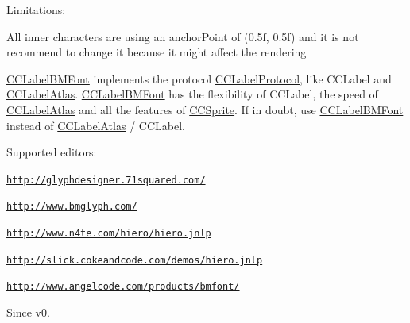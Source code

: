 Limitations\-:
\begin{DoxyItemize}
\item All inner characters are using an anchor\-Point of (0.\-5f, 0.\-5f) and it is not recommend to change it because it might affect the rendering
\end{DoxyItemize}

\hyperlink{interface_c_c_label_b_m_font}{C\-C\-Label\-B\-M\-Font} implements the protocol \hyperlink{protocol_c_c_label_protocol-p}{C\-C\-Label\-Protocol}, like C\-C\-Label and \hyperlink{interface_c_c_label_atlas}{C\-C\-Label\-Atlas}. \hyperlink{interface_c_c_label_b_m_font}{C\-C\-Label\-B\-M\-Font} has the flexibility of C\-C\-Label, the speed of \hyperlink{interface_c_c_label_atlas}{C\-C\-Label\-Atlas} and all the features of \hyperlink{class_c_c_sprite}{C\-C\-Sprite}. If in doubt, use \hyperlink{interface_c_c_label_b_m_font}{C\-C\-Label\-B\-M\-Font} instead of \hyperlink{interface_c_c_label_atlas}{C\-C\-Label\-Atlas} / C\-C\-Label.

Supported editors\-:
\begin{DoxyItemize}
\item \href{http://glyphdesigner.71squared.com/}{\tt http\-://glyphdesigner.\-71squared.\-com/}
\item \href{http://www.bmglyph.com/}{\tt http\-://www.\-bmglyph.\-com/}
\item \href{http://www.n4te.com/hiero/hiero.jnlp}{\tt http\-://www.\-n4te.\-com/hiero/hiero.\-jnlp}
\item \href{http://slick.cokeandcode.com/demos/hiero.jnlp}{\tt http\-://slick.\-cokeandcode.\-com/demos/hiero.\-jnlp}
\item \href{http://www.angelcode.com/products/bmfont/}{\tt http\-://www.\-angelcode.\-com/products/bmfont/}
\end{DoxyItemize}

\begin{DoxySince}{Since}
v0. 
\end{DoxySince}



